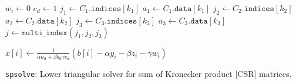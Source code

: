 \begin{minipage}{\textwidth}
\begin{algorithm}[H]
{{{        $w_i \gets 0$ \; 
        $c_d \gets 1$ \; 
         {
          $j_1 \gets C_1.\texttt{indices}[k_1]$ \; 
          $a_1 \gets C_1.\texttt{data}[k_1]$ \; 
           {
            $j_2 \gets C_2.\texttt{indices}[k_2]$ \; 
            $a_2 \gets C_2.\texttt{data}[k_2]$ \; 
             {
              $j_3 \gets C_3.\texttt{indices}[k_3]$ \; 
              $a_3 \gets C_3.\texttt{data}[k_3]$ \; 
              $j \gets \texttt{multi\_index}(j_1, j_2, j_3)$ \; 
            }
          }
        }

        $x[i] \gets \frac{1}{\alpha a_d + \beta b_d \gamma c_d}(b[i] - \alpha y_i - \beta z_i - \gamma w_i)$ \; 

      }
    }
  }

\caption{\texttt{spsolve}: Lower triangular solver for sum of Kronecker product [CSR] matrices.}
\end{algorithm} 
\end{minipage}

